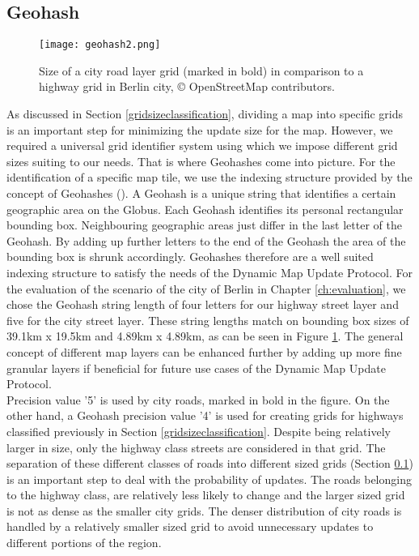 \subsection{Geohash}\label{geohashsizes}
\begin{figure}
\texttt{[image: geohash2.png]}
\caption{Size of a city road layer grid (marked in bold) in comparison to a highway grid in Berlin city, {\copyright} OpenStreetMap contributors.}
\label{fg:geohash}
\end{figure}
As discussed in Section \ref{gridsizeclassification}, dividing a map into specific grids is an important step for minimizing the update size for the map. However, we required a universal grid identifier system using which we impose different grid sizes suiting to our needs. That is where Geohashes come into picture. For the identification of a specific map tile, we use the indexing structure provided by the concept of Geohashes (\citet{suwardi2015geohash}). A Geohash is a unique string that identifies a certain geographic area on the Globus. Each Geohash identifies its personal rectangular bounding box. Neighbouring geographic areas just differ in the last letter of the Geohash. By adding up further letters to the end of the Geohash the area of the bounding box is shrunk accordingly. Geohashes therefore are a well suited indexing structure to satisfy the needs of the Dynamic Map Update Protocol. For the evaluation of the scenario of the city of Berlin in Chapter \ref{ch:evaluation}, we chose the Geohash string length of four letters for our highway street layer and five for the city street layer. These string lengths match on bounding box sizes of 39.1km x 19.5km and 4.89km x 4.89km, as can be seen in Figure \ref{fg:geohash}. The general concept of different map layers can be enhanced further by adding up more fine granular layers if beneficial for future use cases of the Dynamic Map Update Protocol. \\

Precision value '5' is used by city roads, marked in bold in the figure. On the other hand, a Geohash precision value '4' is used for creating grids for highways classified previously in Section \ref{gridsizeclassification}. Despite being relatively larger in size, only the highway class streets are considered in that grid. The separation of these different classes of roads into different sized grids (Section \ref{geohashsizes}) is an important step to deal with the probability of updates. The roads belonging to the highway class, are relatively less likely to change and the larger sized grid is not as dense as the smaller city grids. The denser distribution of city roads is handled by a relatively smaller sized grid to avoid unnecessary updates to different portions of the region. 

